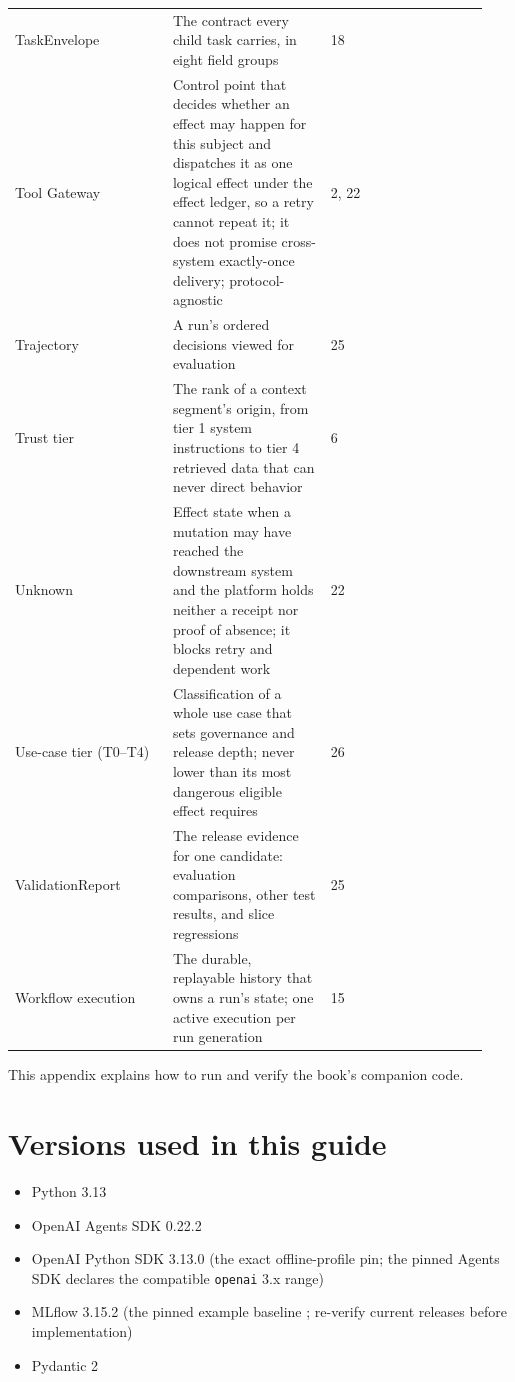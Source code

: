 \begin{longtable}{@{}Y{0.3133\linewidth}Y{0.3133\linewidth}Y{0.3133\linewidth}@{}}
TaskEnvelope & The contract every child task carries, in eight field groups & 18 \\
Tool Gateway & Control point that decides whether an effect may happen for this subject and dispatches it as one logical effect under the effect ledger, so a retry cannot repeat it; it does not promise cross-system exactly-once delivery; protocol-agnostic & 2, 22 \\
Trajectory & A run's ordered decisions viewed for evaluation & 25 \\
Trust tier & The rank of a context segment's origin, from tier 1 system instructions to tier 4 retrieved data that can never direct behavior & 6 \\
Unknown & Effect state when a mutation may have reached the downstream system and the platform holds neither a receipt nor proof of absence; it blocks retry and dependent work & 22 \\
Use-case tier (T0–T4) & Classification of a whole use case that sets governance and release depth; never lower than its most dangerous eligible effect requires & 26 \\
ValidationReport & The release evidence for one candidate: evaluation comparisons, other test results, and slice regressions & 25 \\
Workflow execution & The durable, replayable history that owns a run's state; one active execution per run generation & 15 \\
\end{longtable}
\BookTableEnd


This appendix explains how to run and verify the book's companion code.\par

\section{Versions used in this guide}

\begin{itemize}

\item Python 3.13

\item OpenAI Agents SDK 0.22.2

\item OpenAI Python SDK 3.13.0 (the exact offline-profile pin; the pinned Agents SDK declares the compatible \lstinline[style=bookinline]!openai! 3.x range)

\item MLflow 3.15.2 (the pinned example baseline ; re-verify current releases before implementation)

\item Pydantic 2

\end{itemize}

